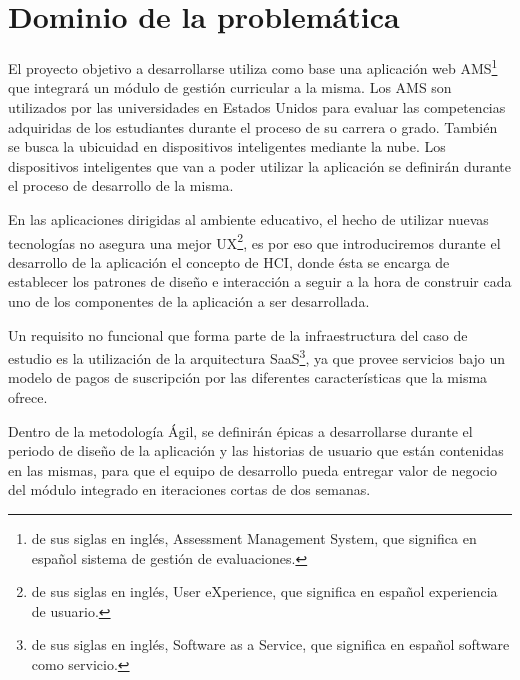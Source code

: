 \section{Dominio de la problemática}
El proyecto objetivo a desarrollarse utiliza como base una aplicación web AMS\footnote{de sus siglas en inglés, Assessment Management System, que significa en español sistema de gestión de evaluaciones.} que integrará un módulo de gestión curricular a la misma. Los AMS son utilizados por las universidades en Estados Unidos para evaluar las competencias adquiridas de los estudiantes durante el proceso de su carrera o grado. También se busca la ubicuidad en dispositivos inteligentes mediante la nube. Los dispositivos inteligentes que van a poder utilizar la aplicación se definirán durante el proceso de desarrollo de la misma.

En las aplicaciones dirigidas al ambiente educativo, el hecho de utilizar nuevas tecnologías no asegura una mejor UX\footnote{de sus siglas en inglés, User eXperience, que significa en español experiencia de usuario.}, es por eso que introduciremos durante el desarrollo de la aplicación el concepto de HCI\citep{lazar_research_2010}, donde ésta se encarga de establecer los patrones de diseño e interacción a seguir a la hora de construir cada uno de los componentes de la aplicación a ser desarrollada.

Un requisito no funcional que forma parte de la infraestructura del caso de estudio es la utilización de la arquitectura SaaS\footnote{de sus siglas en inglés, Software as a Service, que significa en español software como servicio.}, ya que provee servicios bajo un modelo de pagos de suscripción por las diferentes características que la misma ofrece.

Dentro de la metodología Ágil, se definirán épicas a desarrollarse durante el periodo de diseño de la aplicación y las historias de usuario que están contenidas en las mismas, para que el equipo de desarrollo pueda entregar valor de negocio del módulo integrado en iteraciones cortas de dos semanas.
